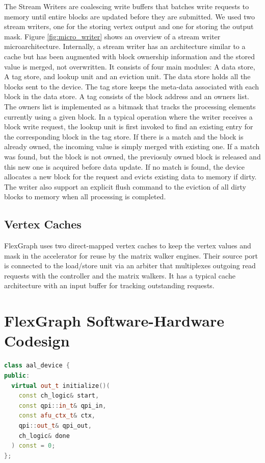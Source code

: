 The Stream Writers are coalescing write buffers that batches write requests to memory until entire blocks are updated before they are submitted. We used two stream writers, one for the storing vertex output and one for storing the output mask. Figure \ref{fig:micro_writer} shows an overview of a stream writer microarchitecture. Internally, a stream writer has an architecture similar to a cache but has been augmented with block ownership information and the stored value is merged, not overwritten. It consists of four main modules: A data store, A tag store, and lookup unit and an eviction unit. The data store holds all the blocks sent to the device. The tag store keeps the meta-data associated with each block in the data store. A tag consists of the block address and an owners list. The owners list is implemented as a bitmask that tracks the processing elements currently using a given block. In a typical operation where the writer receives a block write request, the lookup unit is first invoked to find an existing entry for the corresponding block in the tag store. If there is a match and the block is already owned, the incoming value is simply merged with existing one. If a match was found, but the block is not owned, the previosuly owned block is released and this new one is acquired before data update. If no match is found, the device allocates a new block for the request and evicts existing data to memory if dirty. The writer also support an explicit flush command to the eviction of all dirty blocks to memory when all processing is completed.

\subsection{Vertex Caches}

FlexGraph uses two direct-mapped vertex caches to keep the vertex values and mask in the accelerator for reuse by the matrix walker engines. Their source port is connected to the load/store unit via an arbiter that multiplexes outgoing read requests with the controller and the matrix walkers. It has a typical cache architecture with an input buffer for tracking outstanding requests.

\section{FlexGraph Software-Hardware Codesign}

\begin{lstlisting}[language=C++, caption=AAL Device Interface in Cocoh C++]
class aal_device {
public: 
  virtual out_t initialize()(
    const ch_logic& start, 
    const qpi::in_t& qpi_in, 
    const afu_ctx_t& ctx, 
    qpi::out_t& qpi_out, 
    ch_logic& done
  ) const = 0;  
};
\end{lstlisting}